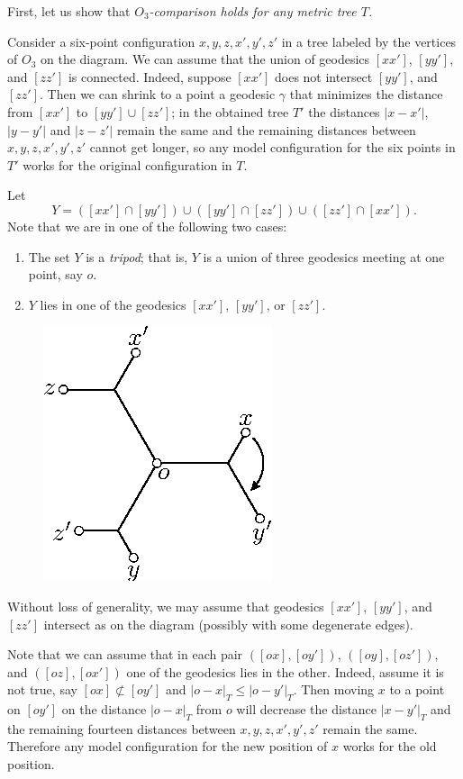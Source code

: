 \documentclass{article}
\begin{document}
\bigskip

First, let us show that \textit{$O_3$-comparison holds for any metric tree $T$.}

Consider a six-point configuration $x,y,z,x',y',z'$ in a tree labeled by the vertices of $O_3$ on the diagram.
We can assume that the union of geodesics $[xx']$, $[yy']$, and $[zz']$ is connected.
Indeed, suppose $[xx']$ does not intersect $[yy']$, and $[zz']$.
Then we can shrink to a point a geodesic $\gamma$ that minimizes the distance from $[xx']$ to $[yy']\cup[zz']$;
in the obtained tree $T'$ the distances $|x-x'|$, $|y-y'|$ and $|z-z'|$ remain the same and the remaining distances between $x,y,z,x',y',z'$ cannot get longer, so any model configuration for the six points in $T'$ works for the original configuration in $T$.

Let 
\[Y=([xx']\cap [yy'])\cup([yy']\cap [zz'])\cup([zz']\cap [xx']).\]
Note that we are in one of the following two cases:
\begin{enumerate}
\item The set $Y$ is a \emph{tripod}; that is, $Y$ is a union of three geodesics meeting at one point, say $o$.
\item $Y$ lies in one of the  geodesics $[xx']$, $[yy']$, or $[zz']$.
\end{enumerate}

\begin{figure}
\vskip-6mm
\centering
\includegraphics{mppics/pic-40}
\end{figure}

Without loss of generality, we may assume that geodesics $[xx']$, $[yy']$, and $[zz']$ intersect as on the diagram (possibly with some degenerate edges).

Note that we can assume that in each pair $([ox],[oy'])$, $([oy],[oz'])$, and $([oz],[ox'])$ one of the geodesics lies in the other.
Indeed, assume it is not true, say $[ox]\not\subset[oy']$ and $|o-x|_T\le |o-y'|_T$.
Then moving $x$ to a point on $[oy']$ on the distance $|o-x|_T$ from $o$ will decrease the distance $|x-y'|_T$ and the remaining fourteen distances between $x,y,z,x',y',z'$ remain the same.
Therefore any model configuration for the new position of $x$ works for the old position.
\end{document}
